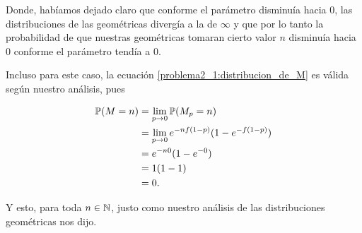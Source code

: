 Donde, habíamos dejado claro que conforme el parámetro disminuía hacia 0, las distribuciones de las geométricas divergía 
a la de $\infty$ y que por lo tanto la probabilidad de que nuestras geométricas tomaran cierto 
valor $n$ disminuía hacia $0$ conforme el parámetro tendía a $0$.\par\null

Incluso para este caso, la ecuación \eqref{problema2_1:distribucion_de_M} es válida según nuestro análisis, pues

\begin{align}
\mathbb{P}(M = n)  &=  \lim_{p \rightarrow 0} \mathbb{P}(M_p = n)                         \\
                &=  \lim_{p \rightarrow 0} e^{-n f(1-p)}(1-e^{- f(1-p)})    \\
                &=  e^{-n 0}(1-e^{- 0})                                     \\
                &=  1(1-1)                                                  \\
                &=  0.
\end{align}

Y esto, para toda $n \in \mathbb{N}$, justo como nuestro análisis de las distribuciones geométricas
nos dijo.